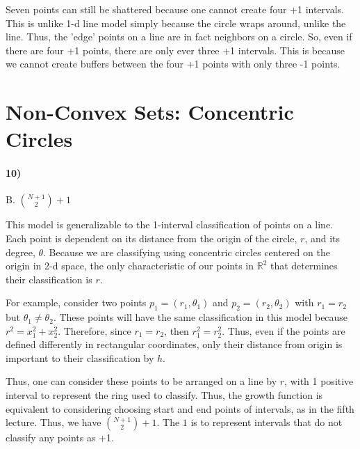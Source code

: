 \documentclass[10pt,letter]{article}
\begin{document}
	Seven points can still be shattered because one cannot create four +1 intervals. This is unlike 1-d line model simply because the circle wraps around, unlike the line. Thus, the 'edge' points on a line are in fact neighbors on a circle. So, even if there are four +1 points, there are only ever three +1 intervals. This is because we cannot create buffers between the four +1 points with only three -1 points.


\section*{Non-Convex Sets: Concentric Circles}

\paragraph{10)} B. $\binom{N+1}{2} + 1$

	This model is generalizable to the 1-interval classification of points on a line. Each point is dependent on its distance from the origin of the circle, $r$, and its degree, $\theta$. Because we are classifying using concentric circles centered on the origin in 2-d space, the only characteristic of our points in $\mathbb R^2$ that determines their classification is $r$. 

	For example, consider two points $p_1 = (r_1, \theta_1)$ and $p_2 = (r_2, \theta_2)$ with $r_1 = r_2$ but $\theta_1 \neq \theta_2$. These points will have the same classification in this model because $r^2 = x_1^2 + x_2^2$. Therefore, since $r_1 = r_2$, then $r_1^2 = r_2^2$. Thus, even if the points are defined differently in rectangular coordinates, only their distance from origin is important to their classification by $h$.

	Thus, one can consider these points to be arranged on a line by $r$, with 1 positive interval to represent the ring used to classify. Thus, the growth function is equivalent to considering choosing start and end points of intervals, as in the fifth lecture. Thus, we have $\binom{N+1}{2} + 1$. The $1$ is to represent intervals that do not classify any points as +1.
\end{document}
